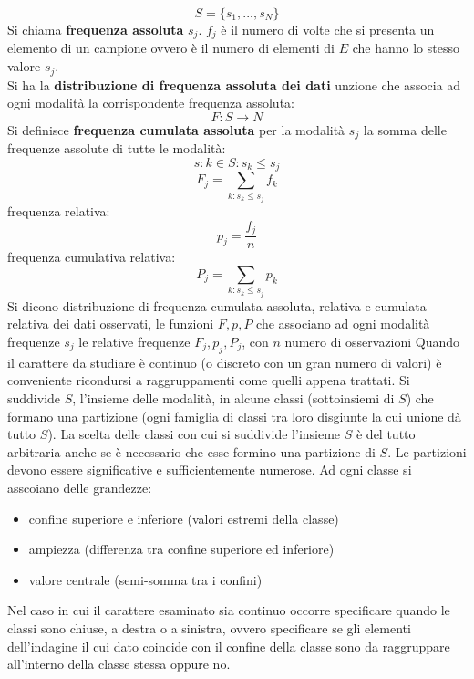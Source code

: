 \documentclass[a4paper,12pt, oneside]{book}
\begin{document}
$$S=\{s_1,...,s_N\}$$
Si chiama \textbf{frequenza assoluta} $s_j$. $f_j$ è il numero di volte che si presenta un elemento di un campione ovvero è il numero di elementi di $E$ che hanno lo stesso valore $s_j$.\\
Si ha la \textbf{distribuzione di frequenza assoluta dei dati} unzione che associa ad ogni modalità la corrispondente frequenza assoluta:
$$F:S\to N$$
Si definisce \textbf{frequenza cumulata assoluta} per la modalità $s_j$ la somma delle frequenze assolute di tutte le modalità:
$$s:k\in S:s_k\leq s_j$$
$$F_j=\sum_{k:s_k\leq s_j} f_k$$
frequenza relativa:
$$p_j=\frac{f_j}{n}$$
frequenza cumulativa relativa:
$$P_j=\sum_{k:s_k\leq s_j} p_k$$
Si dicono distribuzione di frequenza cumulata assoluta, relativa e cumulata relativa dei dati osservati, le funzioni $F,p,P$ che associano ad ogni modalità frequenze $s_j$ le relative frequenze $F_j, p_j, P_j$, con $n$ numero di osservazioni
Quando il carattere da studiare è continuo (o discreto con un gran numero di valori) è conveniente ricondursi a raggruppamenti come quelli appena trattati. Si suddivide $S$, l'insieme delle modalità, in alcune classi (sottoinsiemi di $S$) che formano una partizione (ogni famiglia di classi tra loro disgiunte la cui unione dà tutto $S$). La scelta delle classi con cui si suddivide l'insieme $S$ è del tutto arbitraria anche se è necessario che esse formino una partizione di $S$. Le partizioni devono essere significative e sufficientemente numerose. Ad ogni classe si asscoiano delle grandezze:
\begin{itemize}
\item confine superiore e inferiore (valori estremi della classe)
\item ampiezza (differenza tra confine superiore ed inferiore)
\item valore centrale (semi-somma tra i confini)
\end{itemize}
Nel caso in cui il carattere esaminato sia continuo occorre specificare quando le
classi sono chiuse, a destra o a sinistra, ovvero specificare se gli elementi dell'indagine il cui dato coincide con il confine della classe sono da raggruppare all'interno della classe stessa oppure no.
\end{document}
